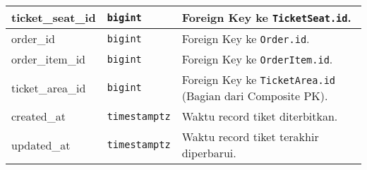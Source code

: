 \begin{longtable}{|l|p{}|p{}|}
	\hline
	ticket\_seat\_id 	& \texttt{bigint} 		& Foreign Key ke \texttt{TicketSeat.id}. 																											\\
	\hline
	order\_id 			& \texttt{bigint} 		& Foreign Key ke \texttt{Order.id}. 																													\\
	\hline
	order\_item\_id 	& \texttt{bigint} 		& Foreign Key ke \texttt{OrderItem.id}. 																												\\
	\hline
	ticket\_area\_id 	& \texttt{bigint} 		& Foreign Key ke \texttt{TicketArea.id} (Bagian dari Composite PK). 																		\\
	\hline
	created\_at 		& \texttt{timestamptz} 	& Waktu record tiket diterbitkan. 																													\\
	\hline
	updated\_at 		& \texttt{timestamptz} 	& Waktu record tiket terakhir diperbarui. 																										\\
\end{longtable}
\endgroup